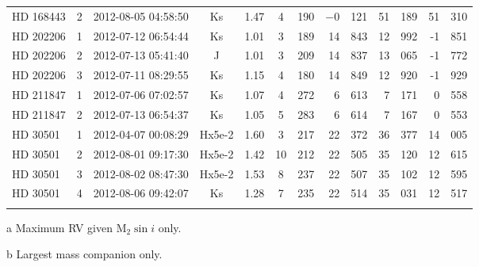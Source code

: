 \begin{table*}
\begin{threeparttable}[b]
\begin{tabular}{l c c c c c c r@{.}l r@{.}l r@{.}l}
                {HD 168443} & 2 & 2012-08-05 04:58:50 & Ks      & 1.47  & 4 & 190 & $-$0   & 121 & 51 & 189 \tnote{a,b} & 51&310\tnote{a,b} \\ %
                {HD 202206} & 1 & 2012-07-12 06:54:44 & Ks      & 1.01  & 3& 189 & 14   & 843 & 12 & 992\tnote{b}  & -1&851 \\ %
                {HD 202206} & 2 & 2012-07-13 05:41:40 & J          & 1.01    & 3 & 209 & 14   & 837 & 13 & 065\tnote{b}  & -1&772 \\ %
                {HD 202206} & 3 & 2012-07-11 08:29:55 & Ks      & 1.15 & 4& 180 & 14   & 849 & 12 & 920\tnote{b}  & -1&929 \\ %
                {HD 211847} & 1 & 2012-07-06 07:02:57 & Ks      & 1.07  & 4& 272 & 6     & 613 & 7   & 171 & 0& 558\\ %
                {HD 211847} & 2 & 2012-07-13 06:54:37 & Ks      & 1.05  & 5& 283 & 6     & 614 & 7   & 167 & 0&553 \\ %
                {HD 30501}  & 1 & 2012-04-07 00:08:29 & Hx5e-2   & 1.60   & 3& 217 & 22   &  372 & 36 & 377 & 14&005 \\ %
                {HD 30501}  & 2 & 2012-08-01 09:17:30 & Hx5e-2 & 1.42  & 10& 212 & 22   & 505 & 35  & 120 & 12&615 \\ %
                {HD 30501}  & 3 & 2012-08-02 08:47:30 & Hx5e-2   & 1.53   & 8& 237 & 22   & 507 &  35 & 102 & 12&595 \\ %
                {HD 30501}  & 4 & 2012-08-06 09:42:07 & Ks       & 1.28   & 7& 235& 22   & 514 & 35 & 031 & 12&517 \\ %
                \bottomrule
                & & & &
        \end{tabular}\label{tab:observations}
        \begin{tablenotes}
            \item  [a]{Maximum {RV} given \(\textrm{M}_2\sin{i}\) only.}
            \item  [b]{Largest mass companion only.}
        \end{tablenotes}
    \end{threeparttable}
\end{table*}
